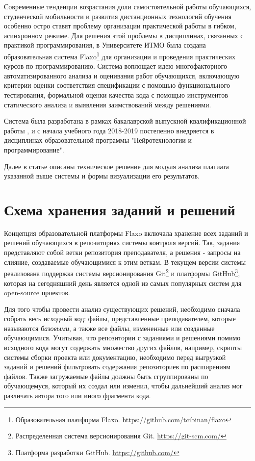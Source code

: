 \documentclass[a4paper,14pt]{extarticle}
\begin{document}
Современные тенденции возрастания доли самостоятельной работы обучающихся, студенческой мобильности и развития дистанционных технологий обучения особенно остро ставят проблему организации практической работы в гибком, асинхронном режиме. Для решения этой проблемы в дисциплинах, связанных с практикой программирования, в Университете ИТМО была создана образовательная система Flaxo\footnote{Образовательная платформа Flaxo. \url{https://github.com/tcibinan/flaxo}} для организации и проведения практических курсов по программированию. Система воплощает идею многофакторного автоматизированного анализа и оценивания работ обучающихся, включающую критерии оценки соответствия спецификации с помощью функционального тестирования, формальной оценки качества кода с помощью инструментов статического анализа и выявления заимствований между решениями.

Система была разработана в рамках бакалаврской выпускной квалификационной работы \citep{flaxoThesis}\citep{flaxoKmu}, и с начала учебного года 2018-2019 постепенно внедряется в дисциплинах образовательной программы "Нейротехнологии и программирование".

Далее в статье описаны техническое решение для модуля анализа плагиата указанной выше системы и формы визуализации его результатов.

\section{Схема хранения заданий и решений}

Концепция образовательной платформы Flaxo включала хранение всех заданий и решений обучающихся в репозиториях системы контроля версий. Так, задания представляют собой ветки репозитория преподавателя, а решения - запросы на слияние, создаваемые обучающимися к этим веткам. В текущем версии системы реализована поддержка системы версионирования Git\footnote{Распределенная система версионирования Git. \url{https://git-scm.com/}} и платформы GitHub\footnote{Платформа разработки GitHub. \url{https://github.com/}}, которая на сегодняшний день является одной из самых популярных систем для open-source проектов.

Для того чтобы провести анализ существующих решений, необходимо сначала собрать весь исходный код: файлы, представленные преподавателем, которые называются \textit{базовыми}, а также все файлы, измененные или созданные обучающимися. Учитывая, что репозитории с заданиями и решениями помимо исходного кода могут содержать множество других файлов, например, скрипты системы сборки проекта или документацию, необходимо перед выгрузкой заданий и решений фильтровать содержания репозиториев по расширениям файлов. Также загружаемые файлы должны быть сгруппированы по обучающемуся, который их создал или изменил, чтобы дальнейший анализ мог различать автора того или иного фрагмента кода. 
\end{document}
